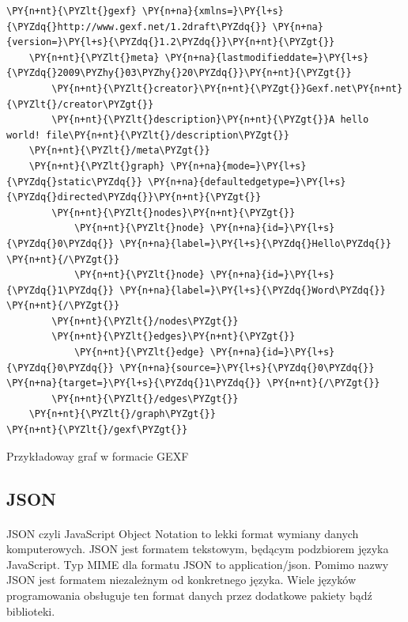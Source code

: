 \begin{program}
\begin{code}
\begin{Verbatim}[commandchars=\\\{\}]
\PY{n+nt}{\PYZlt{}gexf} \PY{n+na}{xmlns=}\PY{l+s}{\PYZdq{}http://www.gexf.net/1.2draft\PYZdq{}} \PY{n+na}{version=}\PY{l+s}{\PYZdq{}1.2\PYZdq{}}\PY{n+nt}{\PYZgt{}}
	\PY{n+nt}{\PYZlt{}meta} \PY{n+na}{lastmodifieddate=}\PY{l+s}{\PYZdq{}2009\PYZhy{}03\PYZhy{}20\PYZdq{}}\PY{n+nt}{\PYZgt{}}
		\PY{n+nt}{\PYZlt{}creator}\PY{n+nt}{\PYZgt{}}Gexf.net\PY{n+nt}{\PYZlt{}/creator\PYZgt{}}
		\PY{n+nt}{\PYZlt{}description}\PY{n+nt}{\PYZgt{}}A hello world! file\PY{n+nt}{\PYZlt{}/description\PYZgt{}}
	\PY{n+nt}{\PYZlt{}/meta\PYZgt{}}
	\PY{n+nt}{\PYZlt{}graph} \PY{n+na}{mode=}\PY{l+s}{\PYZdq{}static\PYZdq{}} \PY{n+na}{defaultedgetype=}\PY{l+s}{\PYZdq{}directed\PYZdq{}}\PY{n+nt}{\PYZgt{}}
		\PY{n+nt}{\PYZlt{}nodes}\PY{n+nt}{\PYZgt{}}
			\PY{n+nt}{\PYZlt{}node} \PY{n+na}{id=}\PY{l+s}{\PYZdq{}0\PYZdq{}} \PY{n+na}{label=}\PY{l+s}{\PYZdq{}Hello\PYZdq{}} \PY{n+nt}{/\PYZgt{}}
			\PY{n+nt}{\PYZlt{}node} \PY{n+na}{id=}\PY{l+s}{\PYZdq{}1\PYZdq{}} \PY{n+na}{label=}\PY{l+s}{\PYZdq{}Word\PYZdq{}} \PY{n+nt}{/\PYZgt{}}
		\PY{n+nt}{\PYZlt{}/nodes\PYZgt{}}
		\PY{n+nt}{\PYZlt{}edges}\PY{n+nt}{\PYZgt{}}
			\PY{n+nt}{\PYZlt{}edge} \PY{n+na}{id=}\PY{l+s}{\PYZdq{}0\PYZdq{}} \PY{n+na}{source=}\PY{l+s}{\PYZdq{}0\PYZdq{}} \PY{n+na}{target=}\PY{l+s}{\PYZdq{}1\PYZdq{}} \PY{n+nt}{/\PYZgt{}}
		\PY{n+nt}{\PYZlt{}/edges\PYZgt{}}
	\PY{n+nt}{\PYZlt{}/graph\PYZgt{}}
\PY{n+nt}{\PYZlt{}/gexf\PYZgt{}}
\end{Verbatim}
\end{code}
\caption{Przykładoway graf w formacie GEXF}
\end{program}

\subsection{JSON}
\paragraph{}
JSON czyli JavaScript Object Notation to lekki format wymiany danych komputerowych. 
JSON jest formatem tekstowym, będącym podzbiorem języka JavaScript. 
Typ MIME dla formatu JSON to application/json. 
Pomimo nazwy JSON jest formatem niezależnym od konkretnego języka. 
Wiele języków programowania obsługuje ten format danych przez dodatkowe pakiety bądź biblioteki.



